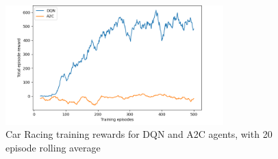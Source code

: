 \begin{figure}[H]
  \centering
  \includegraphics[width=0.75\textwidth]{figures/images/car_racing_rewards.png}
  \caption[Car Racing training rewards]{Car Racing training rewards for DQN and A2C agents, with 20 episode rolling average}
  \label{fig:car_racing_rewards}
\end{figure}
